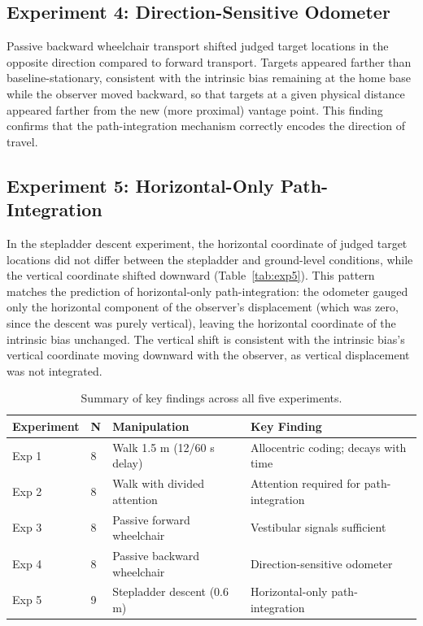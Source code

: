 \documentclass[12pt]{article}
\begin{document}
\subsection{Experiment 4: Direction-Sensitive Odometer}

Passive backward wheelchair transport shifted judged target locations in the opposite direction compared to forward transport. Targets appeared farther than baseline-stationary, consistent with the intrinsic bias remaining at the home base while the observer moved backward, so that targets at a given physical distance appeared farther from the new (more proximal) vantage point. This finding confirms that the path-integration mechanism correctly encodes the direction of travel.

\subsection{Experiment 5: Horizontal-Only Path-Integration}

In the stepladder descent experiment, the horizontal coordinate of judged target locations did not differ between the stepladder and ground-level conditions, while the vertical coordinate shifted downward (Table~\ref{tab:exp5}). This pattern matches the prediction of horizontal-only path-integration: the odometer gauged only the horizontal component of the observer's displacement (which was zero, since the descent was purely vertical), leaving the horizontal coordinate of the intrinsic bias unchanged. The vertical shift is consistent with the intrinsic bias's vertical coordinate moving downward with the observer, as vertical displacement was not integrated.

\begin{table}[ht]
\centering
\caption{Summary of key findings across all five experiments.}
\label{tab:summary}
\begin{tabular}{llll}
\toprule
\textbf{Experiment} & \textbf{N} & \textbf{Manipulation} & \textbf{Key Finding} \\
\midrule
Exp 1 & 8 & Walk 1.5 m (12/60 s delay) & Allocentric coding; decays with time \\
Exp 2 & 8 & Walk with divided attention & Attention required for path-integration \\
Exp 3 & 8 & Passive forward wheelchair & Vestibular signals sufficient \\
Exp 4 & 8 & Passive backward wheelchair & Direction-sensitive odometer \\
Exp 5 & 9 & Stepladder descent (0.6 m) & Horizontal-only path-integration \\
\bottomrule
\end{tabular}
\end{table}
\end{document}
